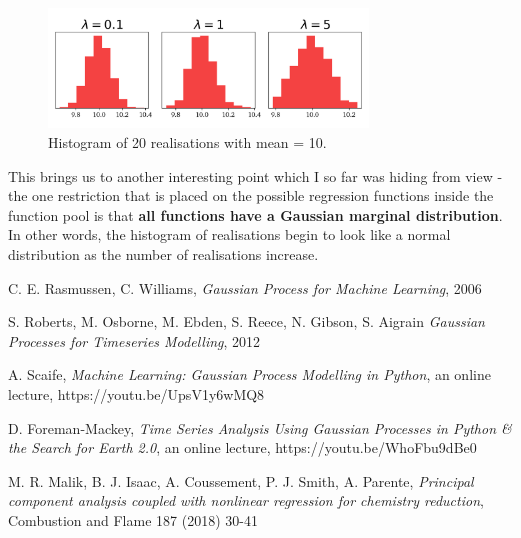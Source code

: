 \documentclass[10pt,twocolumn]{article}
\begin{document}
\begin{figure}[H]
\centering\includegraphics[width=8.5cm]{realisation-Histogram-tex.png}
\caption{Histogram of 20 realisations with mean = 10.}
\label{fig:realisation-histogram}
\end{figure}


This brings us to another interesting point which I so far was hiding from view - the one restriction that is placed on the possible regression functions inside the function pool is that \textbf{all functions have a Gaussian marginal distribution}.
In other words, the histogram of realisations begin to look like a normal distribution as the number of realisations increase.















\thebibliography{}

 C. E. Rasmussen, C. Williams, \textit{Gaussian Process for Machine Learning}, 2006

 S. Roberts, M. Osborne, M. Ebden, S. Reece, N. Gibson, S. Aigrain \textit{Gaussian Processes for Timeseries Modelling}, 2012

 A. Scaife, \textit{Machine Learning: Gaussian Process Modelling in Python}, an online lecture, https://youtu.be/UpsV1y6wMQ8

 D. Foreman-Mackey, \textit{Time Series Analysis Using Gaussian Processes in Python \& the Search for Earth 2.0}, an online lecture, https://youtu.be/WhoFbu9dBe0

 M. R. Malik, B. J. Isaac, A. Coussement, P. J. Smith, A. Parente, \textit{Principal component analysis coupled with nonlinear regression for chemistry reduction}, Combustion and Flame 187 (2018) 30-41
\end{document}
